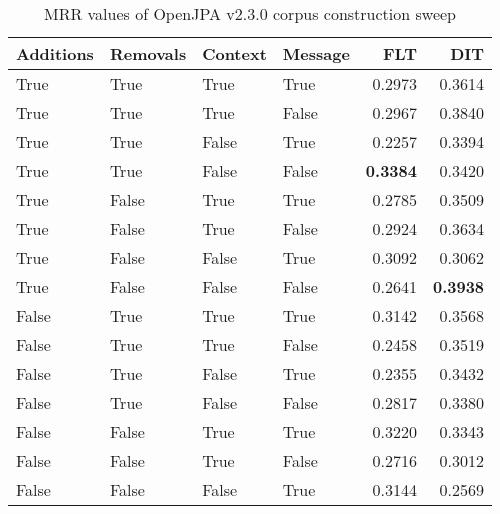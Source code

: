 
\begin{table}
\begin{spacing}{1.2}
\centering
\caption{MRR values of OpenJPA v2.3.0 corpus construction sweep}
\label{table:openjpa_corpus_sweep}
\vspace{0.2em}
\begin{tabular}{llll|rr}
\toprule
Additions & Removals & Context & Message & FLT &       DIT \\
\midrule
     True &     True &    True &    True &           0.2973 &       0.3614 \\
     True &     True &    True &   False &           0.2967 &       0.3840 \\
     True &     True &   False &    True &           0.2257 &       0.3394 \\
     True &     True &   False &   False &     {\bf 0.3384} &       0.3420 \\
     True &    False &    True &    True &           0.2785 &       0.3509 \\
     True &    False &    True &   False &           0.2924 &       0.3634 \\
     True &    False &   False &    True &           0.3092 &       0.3062 \\
     True &    False &   False &   False &           0.2641 & {\bf 0.3938} \\
    False &     True &    True &    True &           0.3142 &       0.3568 \\
    False &     True &    True &   False &           0.2458 &       0.3519 \\
    False &     True &   False &    True &           0.2355 &       0.3432 \\
    False &     True &   False &   False &           0.2817 &       0.3380 \\
    False &    False &    True &    True &           0.3220 &       0.3343 \\
    False &    False &    True &   False &           0.2716 &       0.3012 \\
    False &    False &   False &    True &           0.3144 &       0.2569 \\
\bottomrule
\end{tabular}

\end{spacing}
\end{table}
